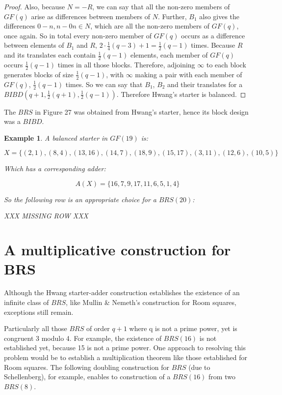 \documentclass[
  11pt,
  a4paper]{book}
\newtheorem{example}{Example}
\begin{document}
\begin{proof}
Also, because $N = -R$, we can say that all the non-zero
members of $GF(q)$ arise as differences between members of
$N$. Further, $B_1$ also gives the differences
$0 - n, n - 0 n\in N$, which are all the non-zero members
of $GF(q)$, once again. So in total every non-zero member of
$GF(q)$ occurs as a difference between elements of $B_1$ and
$R$, $2 \cdot \frac{1}{4}(q - 3) + 1 = \frac{1}{2} (q - 1)$
times.  Because $R$ and its translates each contain
$\frac{1}{2}(q - 1)$ elements, each member of $GF(q)$ occurs
$\frac{1}{2}(q - 1)$ times in all those blocks. Therefore,
adjoining $\infty$ to each block generates blocks of size
$\frac{1}{2}(q - 1)$, with $\infty$ making a pair with each
member of $GF(q)$, $\frac{1}{2}(q - 1)$ times.  So we can say
that $B_1$, $B_2$ and their translates for a
$BIBD(q  +1, \frac{1}{2}(q + 1), \frac{1}{2}(q - 1))$.
Therefore Hwang’s starter is balanced. 
\end{proof}

The \(BRS\) in Figure 27 was obtained from Hwang's starter, hence its
block design was a \(BIBD\).

\begin{example}
A balanced starter in $GF(19)$ is:

\begin{equation}
X = \{(2,1),(8,4),(13,16),(14,7),(18,9),(15,17),(3,11),(12,6),(10,5)\}
\end{equation}

Which has a corresponding adder:

\begin{equation}
A(X) = \{16,7,9,17,11,6,5,1,4\}
\end{equation}

So the following row is an appropriate choice for a
$BRS(20)$:

XXX MISSING ROW XXX

\end{example}

\hypertarget{a-multiplicative-construction-for-brs}{%
\section{A multiplicative construction for BRS}\label{a-multiplicative-construction-for-brs}}

Although the Hwang starter-adder construction establishes
the existence of an infinite class of \(BRS\), like Mullin \&
Nemeth's construction for Room squares, exceptions still
remain.

Particularly all those \(BRS\) of order \(q+1\) where q is not a
prime power, yet is congruent 3 modulo 4. For example, the
existence of \(BRS(16)\) is not established yet, because 15 is
not a prime power. One approach to resolving this problem
would be to establish a multiplication theorem like those
established for Room squares. The following doubling
construction for \(BRS\) (due to Schellenberg), for example,
enables to construction of a \(BRS(16)\) from two \(BRS(8)\).
\end{document}
